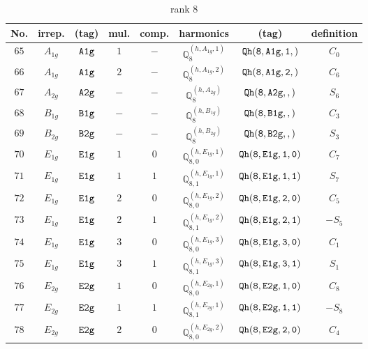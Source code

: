 \documentclass[fleqn,8pt]{jsarticle}
\begin{document}
\begin{table}[ht!]
\begin{center}
\caption{rank 8}
\renewcommand{\arraystretch}{1.3}
\begin{tabular}{cccccccc} \hline \hline
No. & irrep. & (tag) & mul. & comp. & harmonics & (tag) & definition \\ \hline
$ 65 $ & $ A_{1g} $ & $ {\tt A1g} $ & $ 1 $ & $ - $ & $ \mathbb{Q}_{8}^{(h,A_{1g},1)} $ & $ {\tt Qh(8,A1g,1,)} $ & $ C_{0} $ \\
$ 66 $ & $ A_{1g} $ & $ {\tt A1g} $ & $ 2 $ & $ - $ & $ \mathbb{Q}_{8}^{(h,A_{1g},2)} $ & $ {\tt Qh(8,A1g,2,)} $ & $ C_{6} $ \\
$ 67 $ & $ A_{2g} $ & $ {\tt A2g} $ & $ - $ & $ - $ & $ \mathbb{Q}_{8}^{(h,A_{2g})} $ & $ {\tt Qh(8,A2g,,)} $ & $ S_{6} $ \\
$ 68 $ & $ B_{1g} $ & $ {\tt B1g} $ & $ - $ & $ - $ & $ \mathbb{Q}_{8}^{(h,B_{1g})} $ & $ {\tt Qh(8,B1g,,)} $ & $ C_{3} $ \\
$ 69 $ & $ B_{2g} $ & $ {\tt B2g} $ & $ - $ & $ - $ & $ \mathbb{Q}_{8}^{(h,B_{2g})} $ & $ {\tt Qh(8,B2g,,)} $ & $ S_{3} $ \\
$ 70 $ & $ E_{1g} $ & $ {\tt E1g} $ & $ 1 $ & $ 0 $ & $ \mathbb{Q}_{8,0}^{(h,E_{1g},1)} $ & $ {\tt Qh(8,E1g,1,0)} $ & $ C_{7} $ \\
$ 71 $ & $ E_{1g} $ & $ {\tt E1g} $ & $ 1 $ & $ 1 $ & $ \mathbb{Q}_{8,1}^{(h,E_{1g},1)} $ & $ {\tt Qh(8,E1g,1,1)} $ & $ S_{7} $ \\
$ 72 $ & $ E_{1g} $ & $ {\tt E1g} $ & $ 2 $ & $ 0 $ & $ \mathbb{Q}_{8,0}^{(h,E_{1g},2)} $ & $ {\tt Qh(8,E1g,2,0)} $ & $ C_{5} $ \\
$ 73 $ & $ E_{1g} $ & $ {\tt E1g} $ & $ 2 $ & $ 1 $ & $ \mathbb{Q}_{8,1}^{(h,E_{1g},2)} $ & $ {\tt Qh(8,E1g,2,1)} $ & $ - S_{5} $ \\
$ 74 $ & $ E_{1g} $ & $ {\tt E1g} $ & $ 3 $ & $ 0 $ & $ \mathbb{Q}_{8,0}^{(h,E_{1g},3)} $ & $ {\tt Qh(8,E1g,3,0)} $ & $ C_{1} $ \\
$ 75 $ & $ E_{1g} $ & $ {\tt E1g} $ & $ 3 $ & $ 1 $ & $ \mathbb{Q}_{8,1}^{(h,E_{1g},3)} $ & $ {\tt Qh(8,E1g,3,1)} $ & $ S_{1} $ \\
$ 76 $ & $ E_{2g} $ & $ {\tt E2g} $ & $ 1 $ & $ 0 $ & $ \mathbb{Q}_{8,0}^{(h,E_{2g},1)} $ & $ {\tt Qh(8,E2g,1,0)} $ & $ C_{8} $ \\
$ 77 $ & $ E_{2g} $ & $ {\tt E2g} $ & $ 1 $ & $ 1 $ & $ \mathbb{Q}_{8,1}^{(h,E_{2g},1)} $ & $ {\tt Qh(8,E2g,1,1)} $ & $ - S_{8} $ \\
$ 78 $ & $ E_{2g} $ & $ {\tt E2g} $ & $ 2 $ & $ 0 $ & $ \mathbb{Q}_{8,0}^{(h,E_{2g},2)} $ & $ {\tt Qh(8,E2g,2,0)} $ & $ C_{4} $ \\

\end{tabular}
\end{center}
\end{table}
\end{document}
